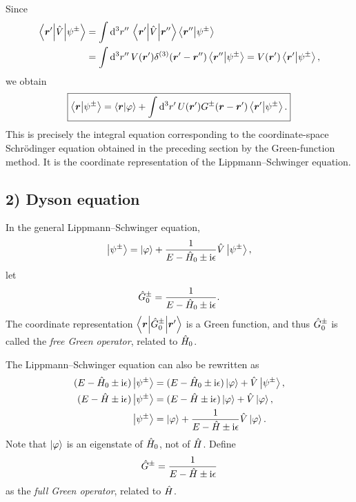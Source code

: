 Since
\begin{equation}\begin{aligned}
\left\langle\bm{r}'\middle|\hat{V}\middle|\psi^\pm\right\rangle
&=\int\mathrm{d}^3r''\,\left\langle\bm{r}'\middle|\hat{V}\middle|\bm{r}''\right\rangle
\left\langle\bm{r}''\middle|\psi^\pm\right\rangle\\
&=\int\mathrm{d}^3r''\,V(\bm{r}')\delta^{(3)}(\bm{r}'-\bm{r}'')
\left\langle\bm{r}''\middle|\psi^\pm\right\rangle
=V(\bm{r}')\left\langle\bm{r}'\middle|\psi^\pm\right\rangle,
\end{aligned}\end{equation}
we obtain
\begin{equation}
\boxed{\left\langle\bm{r}\middle|\psi^\pm\right\rangle=
\left\langle\bm{r}\middle|\varphi\right\rangle+\int\mathrm{d}^3r'\,
U(\bm{r}')G^\pm(\bm{r}-\bm{r}')\left\langle\bm{r}'\middle|\psi^\pm\right\rangle.}
\end{equation}
This is precisely the integral equation corresponding to the coordinate-space Schr\"odinger equation obtained in the preceding section by the Green-function method. It is the coordinate representation of the Lippmann--Schwinger equation.

\subsection*{2) Dyson equation}
In the general Lippmann--Schwinger equation,
\begin{equation}
\left|\psi^\pm\right\rangle=\left|\varphi\right\rangle+\frac1{E-\hat{H}_0\pm\mathrm{i}\epsilon}\hat{V}\left|\psi^\pm\right\rangle,
\end{equation}
let
\begin{equation}
\hat{G}_0^\pm=\frac1{E-\hat{H}_0\pm\mathrm{i}\epsilon}.
\end{equation}
The coordinate representation $\left\langle\bm{r}\middle|\hat{G}_0^\pm\middle|\bm{r}'\right\rangle$ is a Green function, and thus $\hat{G}_0^\pm$ is called the \emph{free Green operator}, related to $\hat{H}_0$.

The Lippmann--Schwinger equation can also be rewritten as
\begin{equation}\begin{aligned}
(E-\hat{H}_0\pm\mathrm{i}\epsilon)\left|\psi^\pm\right\rangle
&=(E-\hat{H}_0\pm\mathrm{i}\epsilon)\left|\varphi\right\rangle+\hat{V}\left|\psi^\pm\right\rangle,\\
(E-\hat{H}\pm\mathrm{i}\epsilon)\left|\psi^\pm\right\rangle
&=(E-\hat{H}\pm\mathrm{i}\epsilon)\left|\varphi\right\rangle+\hat{V}\left|\varphi\right\rangle,\\
\left|\psi^\pm\right\rangle&=\left|\varphi\right\rangle+
\frac1{E-\hat{H}\pm\mathrm{i}\epsilon}\hat{V}\left|\varphi\right\rangle.
\end{aligned}\end{equation}
Note that $\left|\varphi\right\rangle$ is an eigenstate of $\hat{H}_0$, not of $\hat{H}$. Define
\begin{equation}
\hat{G}^\pm=\frac1{E-\hat{H}\pm\mathrm{i}\epsilon}
\end{equation}
as the \emph{full Green operator}, related to $\hat{H}$.

